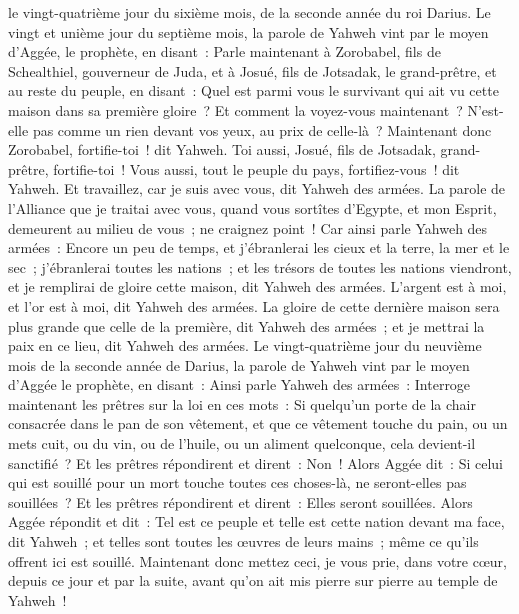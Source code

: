 \begin{multicols}{2}
le vingt-quatrième jour du sixième mois, de la seconde année du roi Darius.
\VerseOne{}Le vingt et unième jour du septième mois, la parole de Yahweh vint par le moyen d'Aggée, le prophète, en disant~:
Parle maintenant à Zorobabel, fils de Schealthiel, gouverneur de Juda, et à Josué, fils de Jotsadak, le grand-prêtre, et au reste du peuple, en disant~:
Quel est parmi vous le survivant qui ait vu cette maison dans sa première gloire~? Et comment la voyez-vous maintenant~? N'est-elle pas comme un rien devant vos yeux, au prix de celle-là~?
Maintenant donc Zorobabel, fortifie-toi~! dit Yahweh. Toi aussi, Josué, fils de Jotsadak, grand-prêtre, fortifie-toi~! Vous aussi, tout le peuple du pays, fortifiez-vous~! dit Yahweh. Et travaillez, car je suis avec vous, dit Yahweh des armées.
La parole de l'Alliance que je traitai avec vous, quand vous sortîtes d'Egypte, et mon Esprit, demeurent au milieu de vous~; ne craignez point~!
Car ainsi parle Yahweh des armées~: Encore un peu de temps, et j'ébranlerai les cieux et la terre, la mer et le sec~;
j'ébranlerai toutes les nations~; et les trésors de toutes les nations viendront, et je remplirai de gloire cette maison, dit Yahweh des armées.
L'argent est à moi, et l'or est à moi, dit Yahweh des armées.
La gloire de cette dernière maison sera plus grande que celle de la première, dit Yahweh des armées~; et je mettrai la paix en ce lieu, dit Yahweh des armées.
Le vingt-quatrième jour du neuvième mois de la seconde année de Darius, la parole de Yahweh vint par le moyen d'Aggée le prophète, en disant~:
Ainsi parle Yahweh des armées~: Interroge maintenant les prêtres sur la loi en ces mots~:
Si quelqu'un porte de la chair consacrée dans le pan de son vêtement, et que ce vêtement touche du pain, ou un mets cuit, ou du vin, ou de l'huile, ou un aliment quelconque, cela devient-il sanctifié~? Et les prêtres répondirent et dirent~: Non~!
Alors Aggée dit~: Si celui qui est souillé pour un mort touche toutes ces choses-là, ne seront-elles pas souillées~? Et les prêtres répondirent et dirent~: Elles seront souillées.
Alors Aggée répondit et dit~: Tel est ce peuple et telle est cette nation devant ma face, dit Yahweh~; et telles sont toutes les œuvres de leurs mains~; même ce qu'ils offrent ici est souillé.
Maintenant donc mettez ceci, je vous prie, dans votre cœur, depuis ce jour et par la suite, avant qu'on ait mis pierre sur pierre au temple de Yahweh~!

\end{multicols}
